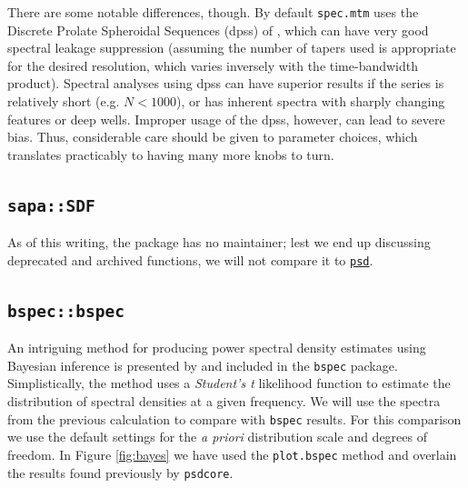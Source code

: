 \documentclass[10pt]{article}\usepackage[]{graphicx}\usepackage[]{color}
\newcommand{\Rcmd}[1]{\texttt{#1}}
\newcommand{\psd}[0]{\href{http://abarbour.github.com/psd/}{\color{blue}\Rcmd{psd}}}
\begin{document}
There are some notable differences, though.  
By default \Rcmd{spec.mtm}
 uses the Discrete Prolate Spheroidal Sequences (dpss) 
of \citet{thomson1982},
which can have very good spectral leakage suppression (assuming
the number of tapers used is appropriate for the 
desired resolution, which varies inversely with the time-bandwidth product).
Spectral analyses using dpss can have superior results if the series is
relatively short (e.g. $N < 1000$), or has inherent spectra
with sharply changing features or
deep wells.
Improper usage of the dpss, however, can lead to severe bias.
Thus, considerable care should be given to parameter choices, 
which translates practicably
to having many more knobs to turn.

\subsection{\Rcmd{sapa::SDF}}
As of this writing, the package has no maintainer; 
lest we end up discussing deprecated and archived functions,
we will not compare it to \psd{}.

\subsection{\Rcmd{bspec::bspec}}
An intriguing method for producing power spectral density estimates
 using Bayesian inference
 is presented by \citet{rover2011} and included in
 the \Rcmd{bspec} package.
 Simplistically, the method uses a \emph{Student's t} likelihood function
 to estimate the distribution of spectral densities
 at a given frequency.
 We will use the spectra from the previous 
 calculation to compare with \Rcmd{bspec} results.
 For this comparison
 we use the default 
 settings for the \emph{a priori} distribution scale
 and degrees of freedom.
 In Figure \ref{fig:bayes} we have used the \Rcmd{plot.bspec} method
 and overlain the results found previously by \Rcmd{psdcore}.
\end{document}
